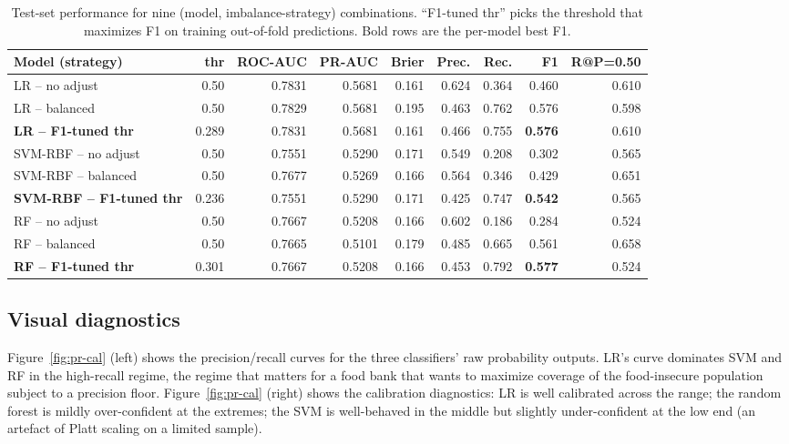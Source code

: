 \documentclass[10pt,letterpaper]{article}
\begin{document}
\begin{table}[!htb]
\centering
\small
\caption{Test-set performance for nine (model, imbalance-strategy) combinations.
``F1-tuned thr'' picks the threshold that maximizes F1 on training
out-of-fold predictions.  Bold rows are the per-model best F1.}
\label{tab:9row}
\begin{tabular}{lrrrrrrrr}
\toprule
Model (strategy) & thr & ROC-AUC & PR-AUC & Brier & Prec. & Rec. & F1 & R@P=0.50 \\
\midrule
LR -- no adjust              & 0.50 & 0.7831 & 0.5681 & 0.161 & 0.624 & 0.364 & 0.460 & 0.610 \\
LR -- balanced               & 0.50 & 0.7829 & 0.5681 & 0.195 & 0.463 & 0.762 & 0.576 & 0.598 \\
\textbf{LR -- F1-tuned thr}  & 0.289 & 0.7831 & 0.5681 & 0.161 & 0.466 & 0.755 & \textbf{0.576} & 0.610 \\
\midrule
SVM-RBF -- no adjust          & 0.50 & 0.7551 & 0.5290 & 0.171 & 0.549 & 0.208 & 0.302 & 0.565 \\
SVM-RBF -- balanced           & 0.50 & 0.7677 & 0.5269 & 0.166 & 0.564 & 0.346 & 0.429 & 0.651 \\
\textbf{SVM-RBF -- F1-tuned thr} & 0.236 & 0.7551 & 0.5290 & 0.171 & 0.425 & 0.747 & \textbf{0.542} & 0.565 \\
\midrule
RF -- no adjust               & 0.50 & 0.7667 & 0.5208 & 0.166 & 0.602 & 0.186 & 0.284 & 0.524 \\
RF -- balanced                & 0.50 & 0.7665 & 0.5101 & 0.179 & 0.485 & 0.665 & 0.561 & 0.658 \\
\textbf{RF -- F1-tuned thr}   & 0.301 & 0.7667 & 0.5208 & 0.166 & 0.453 & 0.792 & \textbf{0.577} & 0.524 \\
\bottomrule
\end{tabular}
\end{table}

\subsection{Visual diagnostics}
Figure~\ref{fig:pr-cal} (left) shows the precision/recall curves for
the three classifiers' raw probability outputs.  LR's curve dominates
SVM and RF in the high-recall regime, the regime that matters for a
food bank that wants to maximize coverage of the food-insecure
population subject to a precision floor.  Figure~\ref{fig:pr-cal}
(right) shows the calibration diagnostics: LR is well calibrated
across the range; the random forest is mildly over-confident at the
extremes; the SVM is well-behaved in the middle but slightly
under-confident at the low end (an artefact of Platt scaling on a
limited sample).
\end{document}
